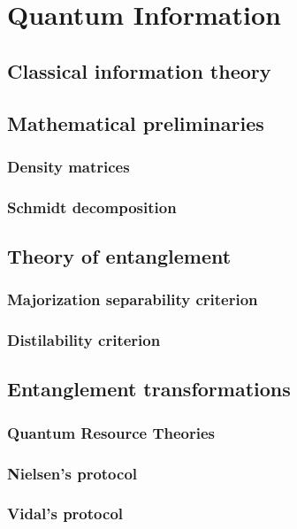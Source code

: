 \chapter{Quantum Information}

\section{Classical information theory} \label{sec:classical_information}



\section{Mathematical preliminaries}

\subsection{Density matrices}



\subsection{Schmidt decomposition}



\section{Theory of entanglement}

\subsection{Majorization separability criterion}



\subsection{Distilability criterion}



\section{Entanglement transformations}

\subsection{Quantum Resource Theories} \label{sec:QRT}



\subsection{Nielsen's protocol} \label{sec:nielsen}



\subsection{Vidal's protocol}

